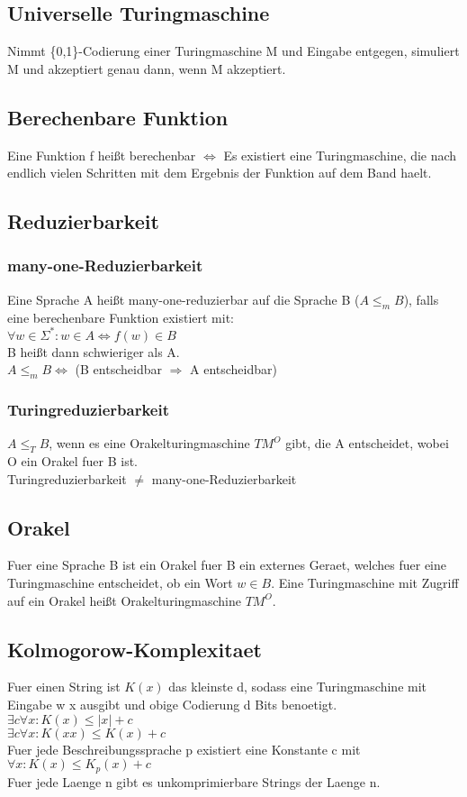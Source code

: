 \documentclass[a4paper]{scrreprt}
\begin{document}
\subsection{Universelle Turingmaschine}
Nimmt \{0,1\}-Codierung einer Turingmaschine M und Eingabe entgegen, simuliert M und akzeptiert genau dann, wenn M akzeptiert.

\subsection{Berechenbare Funktion}
Eine Funktion f heißt berechenbar $\Leftrightarrow$ Es existiert eine Turingmaschine, die nach endlich vielen Schritten mit dem Ergebnis der Funktion auf dem Band haelt.

\subsection{Reduzierbarkeit}
\subsubsection{many-one-Reduzierbarkeit}
Eine Sprache A heißt many-one-reduzierbar auf die Sprache B ($A \le_m B$), falls eine berechenbare Funktion existiert mit:\\
$\forall w \in \Sigma^*: w \in A \Leftrightarrow f(w) \in B$\\
B heißt dann schwieriger als A.\\
$A \le_m B \Leftrightarrow$ (B entscheidbar $\Rightarrow$ A entscheidbar)

\subsubsection{Turingreduzierbarkeit}
$A \le_T B$, wenn es eine Orakelturingmaschine $TM^O$ gibt, die A entscheidet, wobei O ein Orakel fuer B ist.\\
Turingreduzierbarkeit $\neq$ many-one-Reduzierbarkeit

\subsection{Orakel}
Fuer eine Sprache B ist ein Orakel fuer B ein externes Geraet, welches fuer eine Turingmaschine entscheidet, ob ein Wort $w \in B$.
Eine Turingmaschine mit Zugriff auf ein Orakel heißt Orakelturingmaschine $TM^O$.

\subsection{Kolmogorow-Komplexitaet}
Fuer einen String ist $K(x)$ das kleinste d, sodass eine Turingmaschine mit Eingabe w x ausgibt und obige Codierung d Bits benoetigt.\\
$\exists c \forall x: K(x) \le |x| + c$\\
$\exists c \forall x: K(xx) \le K(x) + c$\\
Fuer jede Beschreibungssprache p existiert eine Konstante c mit $\forall x: K(x) \le K_p(x) + c$\\
Fuer jede Laenge n gibt es unkomprimierbare Strings der Laenge n.
\end{document}

